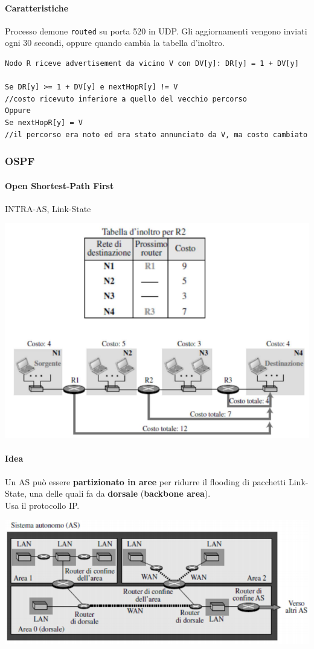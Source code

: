 \documentclass[10pt]{article}
\begin{document}
\paragraph{Caratteristiche} Processo demone \texttt{routed} su porta 520 in UDP. Gli aggiornamenti vengono inviati ogni 30 secondi, oppure quando cambia la tabella d'inoltro.
\begin{lstlisting}
Nodo R riceve advertisement da vicino V con DV[y]: DR[y] = 1 + DV[y]

Se DR[y] >= 1 + DV[y] e nextHopR[y] != V
//costo ricevuto inferiore a quello del vecchio percorso
Oppure
Se nextHopR[y] = V
//il percorso era noto ed era stato annunciato da V, ma costo cambiato
\end{lstlisting}
\pagebreak
\subsubsection{OSPF}
\paragraph{Open Shortest-Path First} INTRA-AS, Link-State
\begin{center}
\includegraphics[scale=0.7]{ospf.png}
\end{center}
\paragraph{Idea} Un AS può essere \textbf{partizionato in aree} per ridurre il flooding di pacchetti Link-State, una delle quali fa da \textbf{dorsale} (\textbf{backbone area}).\\
Usa il protocollo IP.
\begin{center}
\includegraphics[scale=0.7]{ospfaree.png}
\end{center}
\pagebreak
\end{document}
